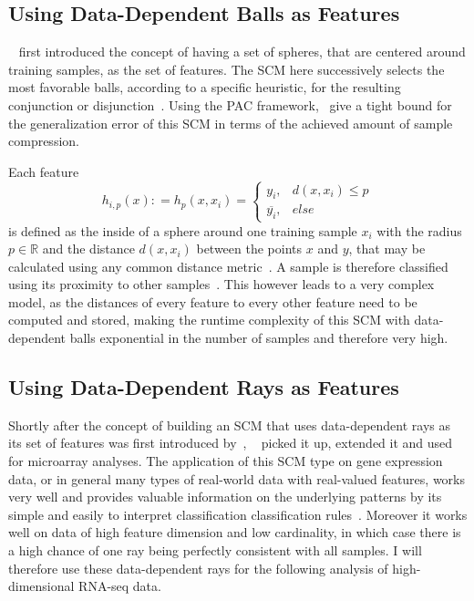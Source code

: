 \subsection{Using Data-Dependent Balls as Features}\label{subsec:balls}

~\cite{marchand02} first introduced the concept of having a set of spheres, that are centered around training samples, as the set of features.
The SCM here successively selects the most favorable balls, according to a specific heuristic, for the resulting conjunction or disjunction~\citep{germain}.
Using the PAC framework,~\cite{marchand02} give a tight bound for the generalization error of this SCM
in terms of the achieved amount of sample compression.

Each feature
\[h_{i,p}(x) \mathrel{\mathop:}= h_p(x,x_i) =
\begin{cases}
    y_i, & d(x,x_i) \leq p \\
    \overline{y_i}, & else
\end{cases}\]
is defined as the inside of a sphere around one training sample \(x_i\) with the radius \(p \in \mathbb{R}\) and
the distance \(d(x,x_i)\) between the points \(x\) and \(y\), that may be calculated using any common distance metric~\citep{marchand02}.
A sample is therefore classified using its proximity to other samples~\citep{germain}.
This however leads to a very complex model, as the distances of every feature to every other feature need to be computed and stored,
making the runtime complexity of this SCM with data-dependent balls exponential in the number of samples and therefore very high.

\subsection{Using Data-Dependent Rays as Features}\label{subsec:rays}

Shortly after the concept of building an SCM that uses data-dependent rays as its set of features was first introduced by~\cite{marchand04},
~\cite{kestler06} picked it up, extended it and used for microarray analyses.
The application of this SCM type on gene expression data, or in general many types of real-world data with real-valued features, works very well and
provides valuable information on the underlying patterns by its simple and easily to interpret classification classification rules~\citep{marchand04,kestler06,kestler11}.
Moreover it works well on data of high feature dimension and low cardinality, in which case there is a high
chance of one ray being perfectly consistent with all samples.
I will therefore use these data-dependent rays for the following analysis of high-dimensional RNA-seq data.

